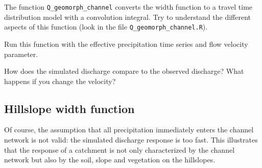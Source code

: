 \documentclass[twocolumn, 10pt, a4paper]{article}
\newenvironment{PC_prac_environment}{
\def\Q{\noindent \color{Gray}\rule[-0.1cm]{\columnwidth}{1.5pt}  \color{black} } \let\ques\Q 
\def\nQ{\noindent \color{black} } \let\ques\nQ 
\def\E{\color{Gray}\rule[0.3cm]{\columnwidth}{1.5pt} \color{black}} \let\ques\E }
\newcommand{\A}[2] { \ifthenelse{\boolean{showanswer}} {\noindent \color{cyan}{#2}\color{black}} {\multido{}{#1}{\noindent \color{light-gray}\hrulefill\\} } }
\begin{document}
\begin{PC_prac_environment}
The function \verb!Q_geomorph_channel! converts the width function to a travel time distribution model with a convolution integral. Try to understand the different aspects of this function (look in the file \verb!Q_geomorph_channel.R!). 

Run this function with the effective precipitation time series and flow velocity parameter.
 
\Q How does the simulated discharge compare to the observed discharge? What happens if you change the velocity?\\
\E


\subsection{Hillslope width function}
Of course, the assumption that all precipitation immediately enters the channel network is not valid: the simulated discharge response is too fast. This illustrates that the response of a catchment is not only characterized by the channel network but also by the soil, slope and vegetation on the hillslopes.


\end{PC_prac_environment}
\end{document}
